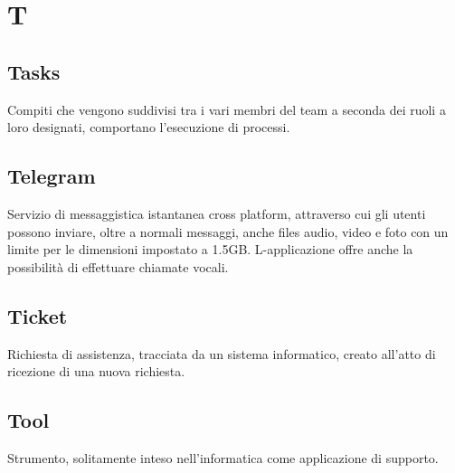 \section*{T}

\subsection{Tasks}
Compiti che vengono suddivisi tra i vari membri del team a seconda dei ruoli a loro designati, comportano l'esecuzione di processi.

\subsection{Telegram}
Servizio di messaggistica istantanea cross platform, attraverso cui gli utenti possono inviare, oltre a normali messaggi, anche files audio, video e foto con un limite per le dimensioni impostato a 1.5GB. L-applicazione offre anche la possibilità di effettuare chiamate vocali.

\subsection{Ticket}
Richiesta di assistenza, tracciata da un sistema informatico, creato all'atto di ricezione di una nuova richiesta.

\subsection{Tool}
Strumento, solitamente inteso nell'informatica come applicazione di supporto.
